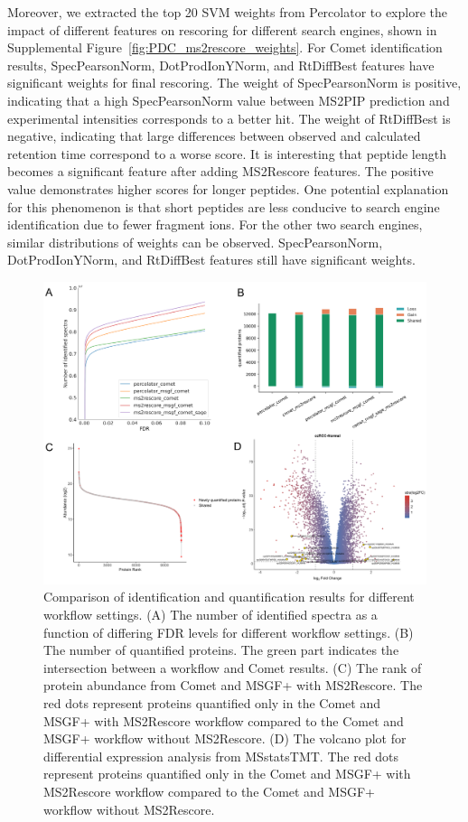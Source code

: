 \documentclass[12pt]{article}
\begin{document}
Moreover, we extracted the top 20 SVM weights from Percolator to explore the impact of different features on rescoring for different search engines, shown in Supplemental Figure~\ref{fig:PDC_ms2rescore_weights}. For Comet identification results, SpecPearsonNorm, DotProdIonYNorm, and RtDiffBest features have significant weights for final rescoring. The weight of SpecPearsonNorm is positive, indicating that a high SpecPearsonNorm value between MS2PIP prediction and experimental intensities corresponds to a better hit. The weight of RtDiffBest is negative, indicating that large differences between observed and calculated retention time correspond to a worse score. It is interesting that peptide length becomes a significant feature after adding MS2Rescore features. The positive value demonstrates higher scores for longer peptides. One potential explanation for this phenomenon is that short peptides are less conducive to search engine identification due to fewer fragment ions. For the other two search engines, similar distributions of weights can be observed. SpecPearsonNorm, DotProdIonYNorm, and RtDiffBest features still have significant weights.

\begin{figure}[h!]
	\centering
	\includegraphics[width=1\textwidth]{figures//CPTAC_TMT.png}
	\caption{Comparison of identification and quantification results for different workflow settings. (A) The number of identified spectra as a function of differing FDR levels for different workflow settings. (B) The number of quantified proteins. The green part indicates the intersection between a workflow and Comet results. (C) The rank of protein abundance from Comet and MSGF+ with MS2Rescore. The red dots represent proteins quantified only in the Comet and MSGF+ with MS2Rescore workflow compared to the Comet and MSGF+ workflow without MS2Rescore. (D) The volcano plot for differential expression analysis from MSstatsTMT. The red dots represent proteins quantified only in the Comet and MSGF+ with MS2Rescore workflow compared to the Comet and MSGF+ workflow without MS2Rescore.}
	\label{fig:PDC_ms2rescore}
\end{figure}
\end{document}
